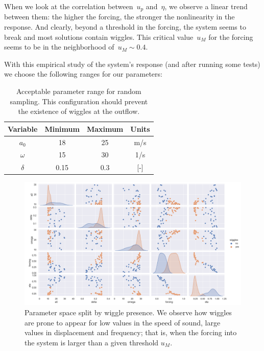 \documentclass[../../thesis.tex]{subfiles}
\begin{document}
When we look at the correlation between~$u_p$ and~$\eta$, we observe a linear trend between them: the higher the forcing, the stronger the nonlinearity in the response.
And clearly, beyond a threshold in the forcing, the system seems to break and most solutions contain wiggles.
This critical value~$u_M$ for the forcing seems to be in the neighborhood of~$u_M \sim 0.4$. 

With this empirical study of the system's response (and after running some tests) we choose the following ranges for our parameters:
\begin{table}[h]
    \centering
    \caption{Acceptable parameter range for random sampling. This configuration should prevent the existence of wiggles at the outflow.}
    \begin{tabular}{cccc}
    \toprule
        Variable  & Minimum & Maximum & Units 
        \\ \midrule
        $a_0$     & 18      & 25      & m/s \\
        $\omega$  & 15      & 30      & 1/s \\
        $\delta$  & 0.15    & 0.3     & [-]
        \\ \bottomrule
    \end{tabular}
\end{table}


\onecolumn
\begin{figure}[h]
    \centering
    \includegraphics[width=1\columnwidth]{research_project/piston/figures/wiggles/wiggle_correlation.png}
    \caption{Parameter space split by wiggle presence.
    We observe how wiggles are prone to appear for low values in the speed of sound,
    large values in displacement and frequency; that is, when the forcing into the system is larger than a given threshold $u_M$.}
    \label{fig:wiggle_correlation}
\end{figure}
\twocolumn
\end{document}
